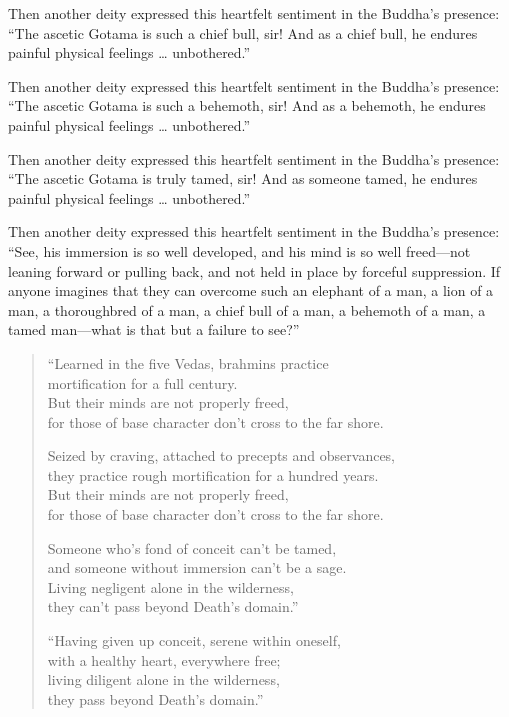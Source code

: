 \documentclass[12pt,openany]{book}%
\begin{document}
Then another deity expressed this heartfelt sentiment in the Buddha’s presence: “The ascetic Gotama is such a chief bull, sir! And as a chief bull, he endures painful physical feelings … unbothered.” 

Then another deity expressed this heartfelt sentiment in the Buddha’s presence: “The ascetic Gotama is such a behemoth, sir! And as a behemoth, he endures painful physical feelings … unbothered.” 

Then another deity expressed this heartfelt sentiment in the Buddha’s presence: “The ascetic Gotama is truly tamed, sir! And as someone tamed, he endures painful physical feelings … unbothered.” 

Then another deity expressed this heartfelt sentiment in the Buddha’s presence: “See, his immersion is so well developed, and his mind is so well freed—not leaning forward or pulling back, and not held in place by forceful suppression. If anyone imagines that they can overcome such an elephant of a man, a lion of a man, a thoroughbred of a man, a chief bull of a man, a behemoth of a man, a tamed man—what is that but a failure to see?” 

\begin{verse}%
“Learned in the five Vedas, brahmins practice \\
mortification for a full century. \\
But their minds are not properly freed, \\
for those of base character don’t cross to the far shore. 

Seized by craving, attached to precepts and observances, \\
they practice rough mortification for a hundred years. \\
But their minds are not properly freed, \\
for those of base character don’t cross to the far shore. 

Someone who’s fond of conceit can’t be tamed, \\
and someone without immersion can’t be a sage. \\
Living negligent alone in the wilderness, \\
they can’t pass beyond Death’s domain.” 

“Having given up conceit, serene within oneself, \\
with a healthy heart, everywhere free; \\
living diligent alone in the wilderness, \\
they pass beyond Death’s domain.” 

%
\end{verse}
\end{document}
